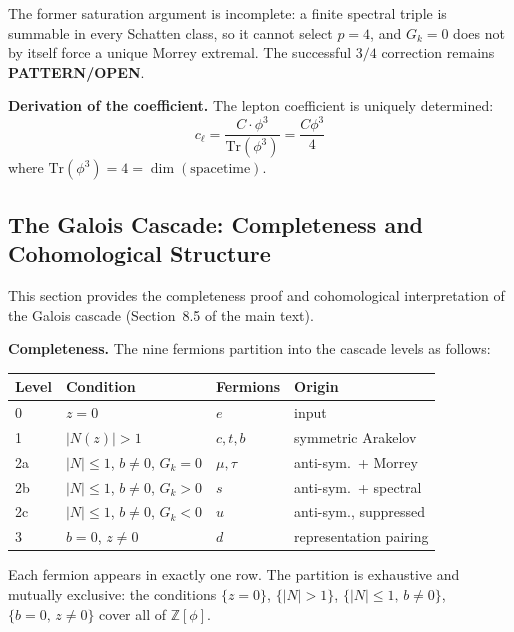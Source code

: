 \documentclass[12pt,a4paper]{article}
\theoremstyle{definition}
\begin{document}
The former saturation argument is incomplete: a finite spectral triple is summable in every Schatten class, so it cannot select $p=4$, and $G_k=0$ does not by itself force a unique Morrey extremal.  The successful $3/4$ correction remains \textbf{PATTERN/OPEN}.

\textbf{Derivation of the coefficient.} The lepton coefficient is uniquely determined:
\begin{equation}
c_\ell = \frac{C \cdot \phi^3}{\mathrm{Tr}(\phi^3)} = \frac{C \phi^3}{4}
\end{equation}
where $\mathrm{Tr}(\phi^3) = 4 = \dim(\text{spacetime})$.

\subsection{The Galois Cascade: Completeness and Cohomological Structure}
\label{sec:S-galois-cascade}

This section provides the completeness proof and cohomological interpretation of the Galois cascade (Section~8.5 of the main text).

\textbf{Completeness.}  The nine fermions partition into the cascade levels as follows:
\begin{center}
\begin{tabular}{llll}
\toprule
\textbf{Level} & \textbf{Condition} & \textbf{Fermions} & \textbf{Origin} \\
\midrule
0 & $z = 0$ & $e$ & input \\
1 & $|N(z)| > 1$ & $c, t, b$ & symmetric Arakelov \\
2a & $|N| \leq 1$, $b \neq 0$, $G_k = 0$ & $\mu, \tau$ & anti-sym.\ + Morrey \\
2b & $|N| \leq 1$, $b \neq 0$, $G_k > 0$ & $s$ & anti-sym.\ + spectral \\
2c & $|N| \leq 1$, $b \neq 0$, $G_k < 0$ & $u$ & anti-sym., suppressed \\
3 & $b = 0$, $z \neq 0$ & $d$ & representation pairing \\
\bottomrule
\end{tabular}
\end{center}
Each fermion appears in exactly one row.  The partition is exhaustive and mutually exclusive: the conditions $\{z=0\}$, $\{|N|>1\}$, $\{|N|\leq 1,\, b\neq 0\}$, $\{b=0,\, z\neq 0\}$ cover all of $\mathbb{Z}[\phi]$.
\end{document}
